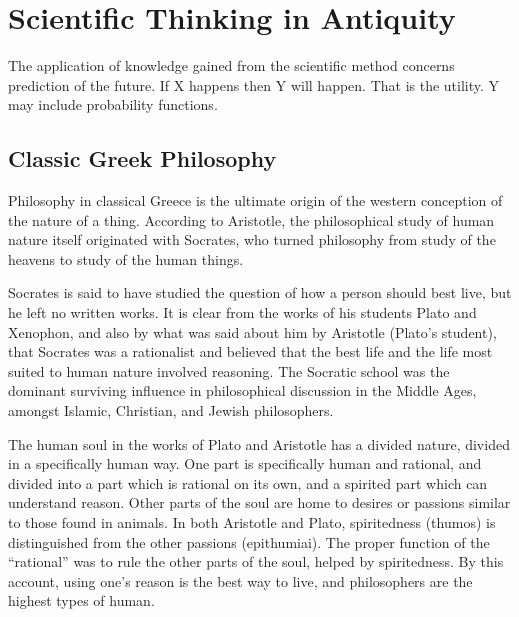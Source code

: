 \section{Scientific Thinking in Antiquity}

The application of knowledge gained from the scientific method concerns prediction of the future. If X happens then Y will happen. That is the utility. Y may include probability functions.

\subsection{Classic Greek Philosophy}

Philosophy in classical Greece is the ultimate origin of the western conception of the nature of a thing. According to Aristotle, the philosophical study of human nature itself originated with Socrates, who turned philosophy from study of the heavens to study of the human things.

Socrates is said to have studied the question of how a person should best live, but he left no written works. It is clear from the works of his students Plato and Xenophon, and also by what was said about him by Aristotle (Plato’s student), that Socrates was a rationalist and believed that the best life and the life most suited to human nature involved reasoning. The Socratic school was the dominant surviving influence in philosophical discussion in the Middle Ages, amongst Islamic, Christian, and Jewish philosophers.

The human soul in the works of Plato and Aristotle has a divided nature, divided in a specifically human way. One part is specifically human and rational, and divided into a part which is rational on its own, and a spirited part which can understand reason. Other parts of the soul are home to desires or passions similar to those found in animals. In both Aristotle and Plato, spiritedness (thumos) is distinguished from the other passions (epithumiai). The proper function of the ``rational'' was to rule the other parts of the soul, helped by spiritedness. By this account, using one’s reason is the best way to live, and philosophers are the highest types of human.

